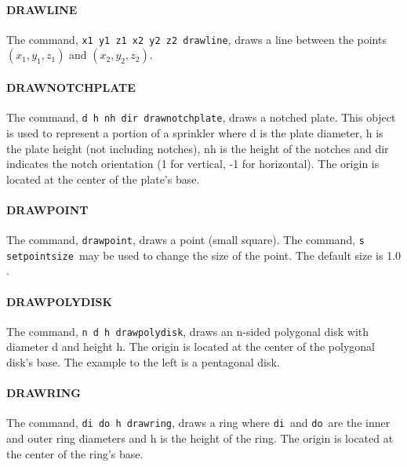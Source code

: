 \documentclass[11pt,twoside]{book}
\begin{document}
\paragraph{DRAWLINE} The
command, {\tt x1 y1 z1 x2 y2 z2 drawline}, draws a line between
the points $(x_1,y_1,z_1)$ and $(x_2,y_2,z_2)$.\vspace{0.25in}

\paragraph{DRAWNOTCHPLATE} The command, {\tt d h nh dir drawnotchplate},
draws a  notched plate.  This object is used to represent a
portion of a sprinkler where d is the plate diameter, h is the
plate height (not including notches), nh is the height of the
notches and dir indicates the notch orientation (1 for vertical,
-1 for horizontal).  The origin is located at the center of the
plate's base.

\paragraph{DRAWPOINT} The command, {\tt drawpoint}, draws a point
(small square).  The command, {\tt s setpointsize}\ may be used to
change the size of the point.  The default size is 1.0 .

\paragraph{DRAWPOLYDISK} The command, {\tt n d h drawpolydisk},
draws an n-sided polygonal disk with diameter d and height h.  The
origin is located at the center of the polygonal disk's base.  The
example to the left is a pentagonal disk.

\paragraph{DRAWRING} The command, {\tt di do h drawring},
draws a ring where {\tt di}\ and {\tt do}\ are the inner and outer
ring diameters and h is the height of the ring. The origin is
located at the center of the ring's base.
\end{document}
